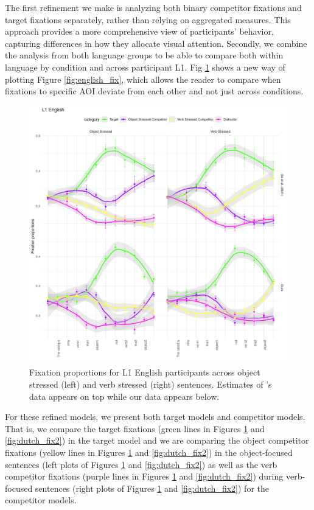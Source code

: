 The first refinement we make is analyzing both binary competitor fixations and target fixations separately, rather than relying on aggregated measures. This approach provides a more comprehensive view of participants’ behavior, capturing differences in how they allocate visual attention. Secondly, we combine the analysis from both language groups to be able to compare both within language by condition and across participant L1. Fig \ref{fig:english_fix2} shows a new way of plotting Figure \ref{fig:english_fix}, which allows the reader to compare when fixations to specific AOI deviate from each other and not just across conditions.

\begin{figure}[H]  %
    \centering
    \includegraphics[width=\textwidth,height=\textheight,keepaspectratio]{viz/english_fix2.png}
    \caption{Fixation proportions for L1 English participants across object stressed (left) and verb stressed (right) sentences. Estimates of \parencite{ge2021a}'s data appears on top while our data appears below.}
    \label{fig:english_fix2}
\end{figure}

For these refined models, we present both target models and competitor models. That is, we compare the target fixations (green lines in Figures \ref{fig:english_fix2} and \ref{fig:dutch_fix2}) in the target model and we are comparing the object competitor fixations (yellow lines in Figures \ref{fig:english_fix2} and \ref{fig:dutch_fix2}) in the object-focused sentences (left plots of Figures \ref{fig:english_fix2} and \ref{fig:dutch_fix2}) as well as the verb competitor fixations (purple lines in Figures \ref{fig:english_fix2} and \ref{fig:dutch_fix2}) during verb-focused sentences (right plots of Figures \ref{fig:english_fix2} and \ref{fig:dutch_fix2}) for the competitor models. 

